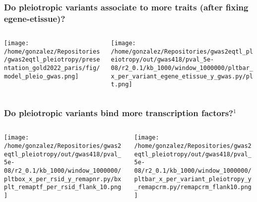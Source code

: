 \documentclass{beamer}
\begin{document}
\begin{frame}
\frametitle{Do pleiotropic variants associate to more traits (after fixing egene-etissue)?}

\begin{columns}
\begin{column}{0.5\textwidth}
    \begin{center}
\texttt{[image: /home/gonzalez/Repositories/gwas2eqtl\_pleiotropy/presentation\_gold2022\_paris/fig/model\_pleio\_gwas.png]}
     \end{center}
\end{column}
\begin{column}{0.5\textwidth}  %
    \begin{center}
\texttt{[image: /home/gonzalez/Repositories/gwas2eqtl\_pleiotropy/out/gwas418/pval\_5e-08/r2\_0.1/kb\_1000/window\_1000000/pltbar\_x\_per\_variant\_egene\_etissue\_y\_gwas.py/plt.png]}
     \end{center}
\end{column}
\end{columns}

\end{frame}

\begin{frame}
\frametitle{Do pleiotropic variants bind more transcription factors?$^1$}

\begin{columns}
\begin{column}{0.5\textwidth}
    \begin{center}
\texttt{[image: /home/gonzalez/Repositories/gwas2eqtl\_pleiotropy/out/gwas418/pval\_5e-08/r2\_0.1/kb\_1000/window\_1000000/pltbox\_x\_per\_rsid\_y\_remapnr.py/bxplt\_remaptf\_per\_rsid\_flank\_10.png]}
     \end{center}
\end{column}
\begin{column}{0.5\textwidth}  %
    \begin{center}
\texttt{[image: /home/gonzalez/Repositories/gwas2eqtl\_pleiotropy/out/gwas418/pval\_5e-08/r2\_0.1/kb\_1000/window\_1000000/pltbar\_x\_per\_variant\_pleiotropy\_y\_remapcrm.py/remapcrm\_flank10.png]}
     \end{center}
\end{column}
\end{columns}

\end{frame}
\end{document}
